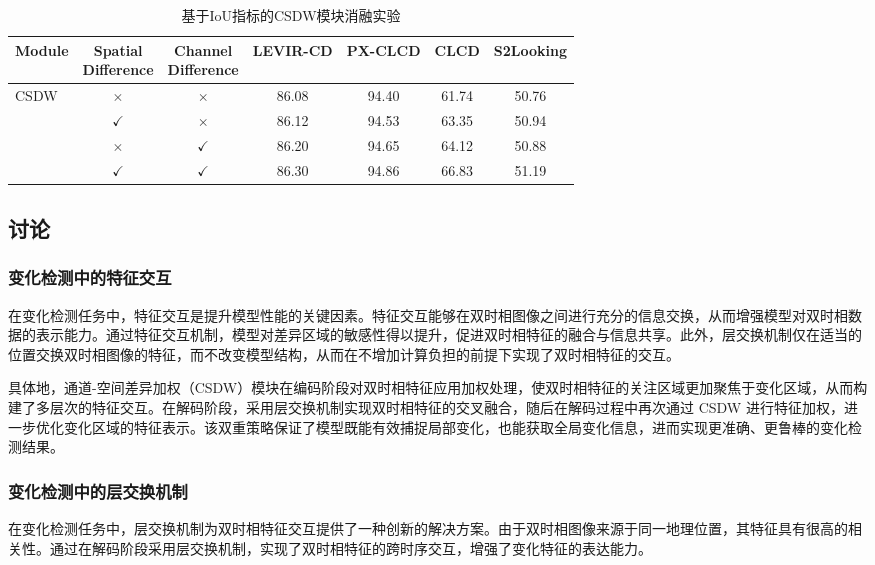 \begin{table}[!htbp]
  \centering
  \caption{基于IoU指标的CSDW模块消融实验}
  \label{tab:lenet_ablation_csdw}
  \begin{tabular}{lcccccc}
    \toprule
    Module 
      & \makecell{Spatial\\Difference} 
      & \makecell{Channel\\Difference} 
      & LEVIR-CD 
      & PX-CLCD 
      & CLCD  
      & S2Looking \\
    \midrule
    CSDW               & $\times$      & $\times$      & 86.08    & 94.40   & 61.74 & 50.76     \\
                       & $\checkmark$  & $\times$      & 86.12    & 94.53   & 63.35 & 50.94     \\
                       & $\times$      & $\checkmark$  & 86.20    & 94.65   & 64.12 & 50.88     \\
                       & $\checkmark$  & $\checkmark$  & 86.30    & 94.86   & 66.83 & 51.19     \\
    \bottomrule
  \end{tabular}
\end{table}



\subsection{讨论}

\subsubsection{变化检测中的特征交互}
在变化检测任务中，特征交互是提升模型性能的关键因素。特征交互能够在双时相图像之间进行充分的信息交换，从而增强模型对双时相数据的表示能力。通过特征交互机制，模型对差异区域的敏感性得以提升，促进双时相特征的融合与信息共享。此外，层交换机制仅在适当的位置交换双时相图像的特征，而不改变模型结构，从而在不增加计算负担的前提下实现了双时相特征的交互。

具体地，通道-空间差异加权（CSDW）模块在编码阶段对双时相特征应用加权处理，使双时相特征的关注区域更加聚焦于变化区域，从而构建了多层次的特征交互。在解码阶段，采用层交换机制实现双时相特征的交叉融合，随后在解码过程中再次通过 CSDW 进行特征加权，进一步优化变化区域的特征表示。该双重策略保证了模型既能有效捕捉局部变化，也能获取全局变化信息，进而实现更准确、更鲁棒的变化检测结果。

\subsubsection{变化检测中的层交换机制}
在变化检测任务中，层交换机制为双时相特征交互提供了一种创新的解决方案。由于双时相图像来源于同一地理位置，其特征具有很高的相关性。通过在解码阶段采用层交换机制，实现了双时相特征的跨时序交互，增强了变化特征的表达能力。


